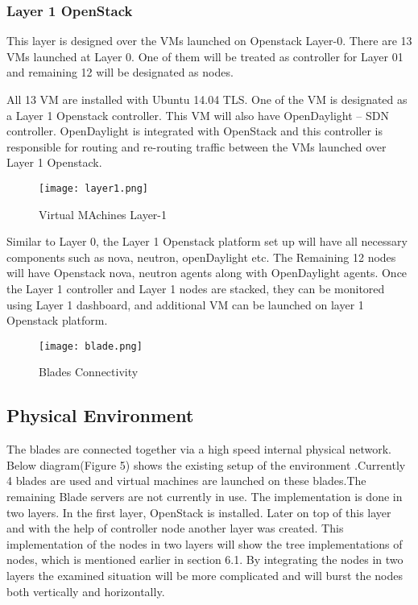 \documentclass{article}
\begin{document}
\subsubsection{Layer 1 OpenStack }
This layer is designed over the VMs launched on Openstack Layer-0. There are 13 VMs launched at Layer 0. One of them will be treated as controller for Layer 01 and remaining 12 will be designated as nodes.

All 13 VM are installed with Ubuntu 14.04 TLS. One of the VM is designated as a Layer 1 Openstack controller. This VM will also have OpenDaylight – SDN controller. OpenDaylight is integrated with OpenStack and this controller is responsible for routing and re-routing traffic between the VMs launched over Layer 1 Openstack. \\
\begin{figure}[h]
	\caption{Virtual MAchines Layer-1}
	\centering
	\texttt{[image: layer1.png]}
\end{figure}
Similar to Layer 0, the Layer 1 Openstack platform set up will have all necessary components such as nova, neutron, openDaylight etc. The Remaining 12 nodes will have Openstack nova, neutron agents along with OpenDaylight agents. 
Once the Layer 1 controller and Layer 1 nodes are stacked, they can be monitored using Layer 1 dashboard, and additional VM can be launched on layer 1 Openstack platform.\\
\begin{figure}[h]
	\caption{Blades Connectivity}
	\centering
	\texttt{[image: blade.png]}
\end{figure}


\subsection{Physical Environment}

The blades are connected together via a high speed internal physical network. Below diagram(Figure 5) shows the existing setup of the environment .Currently 4 blades are used and virtual machines are launched on these blades.The remaining Blade servers are not currently in use. The implementation is done in two layers. In the first layer, OpenStack is installed. Later on top of this layer and with the help of controller node another layer was created. This implementation of  the nodes in two layers will show the tree implementations of nodes, which is mentioned earlier in section 6.1. By integrating the nodes in two layers the examined situation will be more complicated and will burst the nodes both vertically and horizontally.
\end{document}
